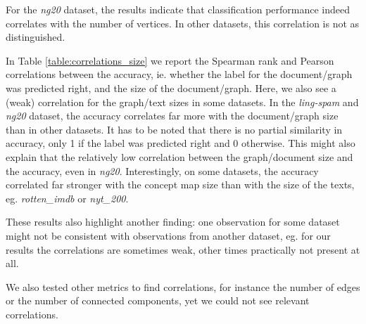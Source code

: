For the \textit{ng20} dataset, the results indicate that classification performance indeed correlates with the number of vertices.
In other datasets, this correlation is not as distinguished.
\fi

In Table \ref{table:correlations_size} we report the Spearman rank and Pearson correlations  \cite{Hauke2011} between the accuracy, ie. whether the label for the document/graph was predicted right, and the size of the document/graph.
Here, we also see a (weak) correlation for the graph/text sizes in some datasets.
In the \textit{ling-spam} and \textit{ng20} dataset, the accuracy correlates far more with the document/graph size than in other datasets.
It has to be noted that there is no partial similarity in accuracy, only 1 if the label was predicted right and 0 otherwise.
This might also explain that the relatively low correlation between the graph/document size and the accuracy, even in \textit{ng20}.
Interestingly, on some datasets, the accuracy correlated far stronger with the concept map size than with the size of the texts, eg. \textit{rotten\_imdb} or \textit{nyt\_200}.

These results also highlight another finding: one observation for some dataset might not be consistent with observations from another dataset, eg. for our results the correlations are sometimes weak, other times practically not present at all.

We also tested other metrics to find correlations, for instance the number of edges or the number of connected components, yet we could not see relevant correlations.

